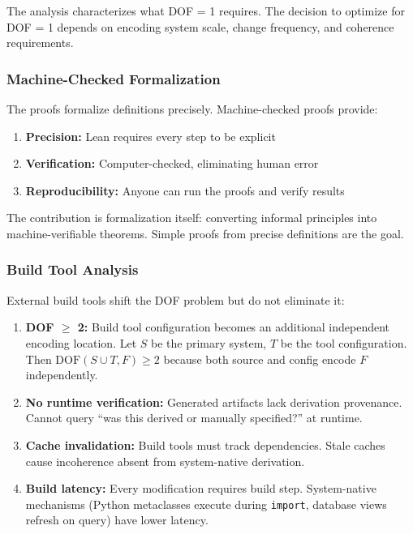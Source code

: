 The analysis characterizes what DOF = 1 requires. The decision to optimize for DOF = 1 depends on encoding system scale, change frequency, and coherence requirements.

\subsubsection{Machine-Checked Formalization}

The proofs formalize definitions precisely. Machine-checked proofs provide:

\begin{enumerate}
\item \textbf{Precision:} Lean requires every step to be explicit
\item \textbf{Verification:} Computer-checked, eliminating human error
\item \textbf{Reproducibility:} Anyone can run the proofs and verify results
\end{enumerate}

The contribution is formalization itself: converting informal principles into machine-verifiable theorems. Simple proofs from precise definitions are the goal.

\subsubsection{Build Tool Analysis}

External build tools shift the DOF problem but do not eliminate it:

\begin{enumerate}
\item \textbf{DOF $\geq$ 2:} Build tool configuration becomes an additional independent encoding location. Let $S$ be the primary system, $T$ be the tool configuration. Then $\text{DOF}(S \cup T, F) \geq 2$ because both source and config encode $F$ independently.

\item \textbf{No runtime verification:} Generated artifacts lack derivation provenance. Cannot query ``was this derived or manually specified?'' at runtime.

\item \textbf{Cache invalidation:} Build tools must track dependencies. Stale caches cause incoherence absent from system-native derivation.

\item \textbf{Build latency:} Every modification requires build step. System-native mechanisms (Python metaclasses execute during \texttt{import}, database views refresh on query) have lower latency.
\end{enumerate}

